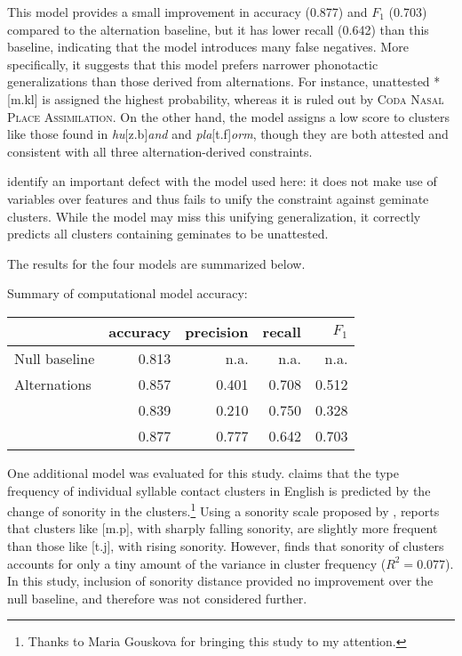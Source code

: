 This model provides a small improvement in accuracy (0.877) and $F_1$ (0.703) compared to the alternation baseline, but it has lower recall (0.642) than this baseline, indicating that the \citeauthor{Hayes2008a} model introduces many false negatives. 
More specifically, it suggests that this model prefers narrower phonotactic generalizations than those derived from alternations. For instance, unattested *[m.kl] is assigned the highest probability, whereas it is ruled out by \textsc{Coda Nasal Place Assimilation}. On the other hand, the \citeauthor{Hayes2008a} model assigns a low score to clusters like those found in \emph{hu}[z.b]\emph{and} and \emph{pla}[t.f]\emph{orm}, though they are both attested and consistent with all three alternation-derived constraints. 

\citet{Berent2012} identify an important defect with the \citeauthor{Hayes2008a} model used here: it does not make use of variables over features and thus fails to unify the constraint against geminate clusters. While the model may miss this unifying generalization, it correctly predicts all clusters containing geminates to be unattested. 

The results for the four models are summarized below.

\begin{example}
Summary of computational model accuracy: 

\vspace{0.5\baselineskip} 
\begin{tabular}{l | r r r r}
\toprule
                          & accuracy & precision & recall & $F_1$ \\ 
\midrule
Null baseline             & 0.813    & n.a.      & n.a.   & n.a.  \\
Alternations              & 0.857    & 0.401     & 0.708  & 0.512 \\
\citet{Pierrehumbert1994} & 0.839    & 0.210     & 0.750  & 0.328 \\
\citet{Hayes2008a}        & 0.877    & 0.777     & 0.642  & 0.703 \\
\bottomrule
\end{tabular}
\end{example}

One additional model was evaluated for this study. \citet{McGowan2011} claims that the type frequency of individual syllable contact clusters in English is predicted by the change of sonority in the clusters.\footnote{Thanks to Maria Gouskova for bringing this study to my attention.} Using a sonority scale proposed by \citet{Jespersen1904}, \citeauthor{McGowan2011} reports that clusters like [m.p], with sharply falling sonority, are slightly more frequent than those like [t.j], with rising sonority. However, \citeauthor{McGowan2011} finds that sonority of clusters accounts for only a tiny amount of the variance in cluster frequency ($R^2 = 0.077$). In this study, inclusion of sonority distance provided no improvement over the null baseline, and therefore was not considered further.
